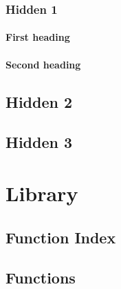 \section{Hidden 1}



\label{1027738413916218921}{}


\subsection{First heading}



\label{15441515940141321147}{}


\subsection{Second heading}



\label{4961812884660315121}{}


\chapter{Hidden 2}



\label{14698839771105993437}{}


\chapter{Hidden 3}



\label{4462048914964654574}{}


\part{Library}




\chapter{Function Index}



\label{9596384704859398879}{}



\chapter{Functions}



\label{13536066633202303496}{}


